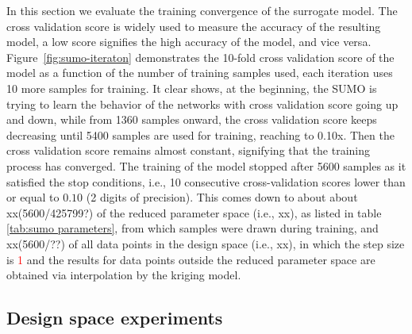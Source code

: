 In this section we evaluate the training convergence of
the surrogate model. The cross validation score is widely used to measure the accuracy of the resulting model, a low score signifies the high accuracy of the model, and vice versa. Figure~\ref{fig:sumo-iteraton} demonstrates the 10-fold cross validation score of the model as a function of the number of training samples used, each iteration uses 10 more samples for training.  %
It clear shows, at the beginning, the SUMO is trying to learn the behavior of the networks with cross validation score going up and down, while from 1360 samples onward, the cross validation score keeps decreasing until 5400 samples are used for training, reaching to 0.10x. Then the cross validation score remains almost constant, signifying that the training process has converged. The training of the model stopped after 5600 samples as it satisfied the stop conditions, i.e., 10 consecutive cross-validation scores lower than or equal to $0.10$ (2 digits of precision). This comes down to about 
about xx(5600/425799?) of the reduced parameter space (i.e., xx), as listed in table \ref{tab:sumo parameters}, from which samples were drawn during training, and xx(5600/??) of all data points in the design space (i.e., xx), in which the step size is \textcolor{red}{1} and the results for data points outside the reduced parameter space are obtained via interpolation by the kriging  model.





\subsection{Design space experiments}


